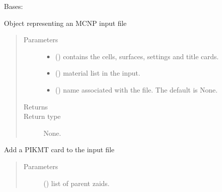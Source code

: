 \documentclass[letterpaper,10pt,english]{sphinxmanual}
\begin{document}
\begin{fulllineitems}
\label{\detokenize{api/inputgeneration:inputfile.D1S_Input}}
\sphinxAtStartPar
Bases: {\hyperref[\detokenize{api/inputgeneration:inputfile.InputFile}]{}}

\sphinxAtStartPar
Object representing an MCNP input file
\begin{quote}\begin{description}
\item[{Parameters}] \leavevmode\begin{itemize}
\item {} 
\sphinxAtStartPar
{} () \textendash{} contains the cells, surfaces, settings and title cards.

\item {} 
\sphinxAtStartPar
{} () \textendash{} material list in the input.

\item {} 
\sphinxAtStartPar
{} (\sphinxstyleliteralemphasis{\sphinxupquote{, }}) \textendash{} name associated with the file. The default is None.

\end{itemize}

\item[{Returns}] \leavevmode
\sphinxAtStartPar


\item[{Return type}] \leavevmode
\sphinxAtStartPar
None.

\end{description}\end{quote}

\begin{fulllineitems}
\label{\detokenize{api/inputgeneration:inputfile.D1S_Input.add_PIKMT_card}}
\sphinxAtStartPar
Add a PIKMT card to the input file
\begin{quote}\begin{description}
\item[{Parameters}] \leavevmode
\sphinxAtStartPar
{} () \textendash{} list of parent zaids.


\end{description}
\end{quote}
\end{fulllineitems}
\end{fulllineitems}
\end{document}

